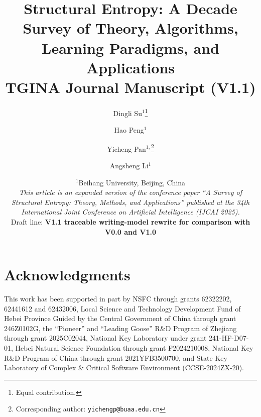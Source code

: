\documentclass[12pt,a4paper]{article}
\title{%
  Structural Entropy: A Decade Survey of Theory, Algorithms,\\
  Learning Paradigms, and Applications\\
  \large TGINA Journal Manuscript (V1.1)
}
\author{%
  Dingli Su$^{1}$\thanks{Equal contribution.}
  \and
  Hao Peng$^{1}$
  \and
  Yicheng Pan$^{1,}$\thanks{Corresponding author: \texttt{yichengp@buaa.edu.cn}}
  \and
  Angsheng Li$^{1}$
}
\date{%
  $^1$Beihang University, Beijing, China\\[4pt]
  \small
  \emph{This article is an expanded version of the conference paper
  ``A Survey of Structural Entropy: Theory, Methods, and Applications''
  published at the 34th International Joint Conference on
  Artificial Intelligence (IJCAI 2025).}\\[4pt]
  \small Draft line: \textbf{V1.1 traceable writing-model rewrite for comparison with V0.0 and V1.0}
}
\begin{document}
\maketitle
\thispagestyle{plain}












\section*{Acknowledgments}
This work has been supported in part by NSFC through grants 62322202, 62441612
and 62432006, Local Science and Technology Development Fund of Hebei Province
Guided by the Central Government of China through grant 246Z0102G, the
``Pioneer'' and ``Leading Goose'' R\&D Program of Zhejiang through grant
2025C02044, National Key Laboratory under grant 241-HF-D07-01, Hebei Natural
Science Foundation through grant F2024210008, National Key R\&D Program of China
through grant 2021YFB3500700, and State Key Laboratory of Complex \& Critical
Software Environment (CCSE-2024ZX-20).




\appendix

\end{document}
